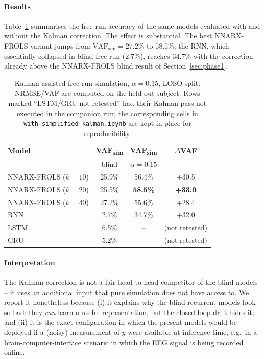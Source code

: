 \documentclass[conference]{IEEEtran}
\begin{document}
\paragraph{Results}
Table~\ref{tab:kalman} summarises the free-run accuracy of the same
models evaluated with and without the Kalman correction. The effect is
substantial. The best NNARX-FROLS variant jumps from
$\mathrm{VAF_{sim}}=27.2\%$ to $58.5\%$; the RNN, which essentially
collapsed in blind free-run ($2.7\%$), reaches $34.7\%$ with the
correction -- already above the NNARX-FROLS blind result of
Section~\ref{sec:phase1}.

\begin{table}[t]
\centering
\caption{Kalman-assisted free-run simulation, $\alpha=0.15$, LOSO split.
NRMSE/VAF are computed on the held-out subject. Rows marked
``LSTM/GRU not retested'' had their Kalman pass not executed in the
companion run; the corresponding cells in
\texttt{with\_simplified\_kalman.ipynb} are kept in place for
reproducibility.}
\label{tab:kalman}
\setlength{\tabcolsep}{4pt}
\begin{tabular}{lccc}
\toprule
\textbf{Model}
& \textbf{VAF\textsubscript{sim}}
& \textbf{VAF\textsubscript{sim}}
& \textbf{$\Delta$VAF} \\
& blind & $\alpha=0.15$ & \\
\midrule
NNARX-FROLS ($k=10$) & 25.9\% & 56.4\% & +30.5 \\
NNARX-FROLS ($k=20$) & 25.5\% & \textbf{58.5\%} & \textbf{+33.0} \\
NNARX-FROLS ($k=40$) & 27.2\% & 55.6\% & +28.4 \\
RNN                  &  2.7\% & 34.7\% & +32.0 \\
LSTM                 &  6.5\% & --     & (not retested) \\
GRU                  &  5.2\% & --     & (not retested) \\
\bottomrule
\end{tabular}
\end{table}

\paragraph{Interpretation}
The Kalman correction is not a fair head-to-head competitor of the
blind models -- it uses an additional input that pure simulation does
not have access to. We report it nonetheless because (i) it explains
why the blind recurrent models look so bad: they \emph{can} learn a
useful representation, but the closed-loop drift hides it; and
(ii) it is the exact configuration in which the present models would
be deployed if a (noisy) measurement of $y$ were available at
inference time, e.g.\ in a brain-computer-interface scenario in which
the EEG signal is being recorded online.
\end{document}
